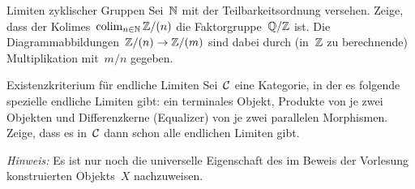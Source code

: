\documentclass{uebblatt}
\begin{document}

\begin{aufgabe}{Limiten zyklischer Gruppen}
Sei~$\mathbb{N}$ mit der Teilbarkeitsordnung versehen. Zeige, dass
der Kolimes~$\operatorname{colim}_{n \in \mathbb{N}} \mathbb{Z}/(n)$ die Faktorgruppe~$\mathbb{Q}/\mathbb{Z}$ ist. Die
Diagrammabbildungen~$\mathbb{Z}/(n) \to \mathbb{Z}/(m)$ sind dabei durch (in~$\mathbb{Z}$ zu
berechnende) Multiplikation mit~$m/n$ gegeben.
\end{aufgabe}

\begin{aufgabe}{Existenzkriterium für endliche Limiten}
Sei~$\mathcal{C}$ eine Kategorie, in der es folgende spezielle endliche Limiten gibt:
ein terminales Objekt, Produkte von je zwei Objekten und Differenzkerne
(Equalizer) von je zwei parallelen Morphismen. Zeige, dass es in~$\mathcal{C}$
dann schon alle endlichen Limiten gibt.

{\tiny\emph{Hinweis:} Es ist nur noch die universelle Eigenschaft des im Beweis der
Vorlesung konstruierten Objekts~$X$ nachzuweisen.\par}
\end{aufgabe}
\end{document}
